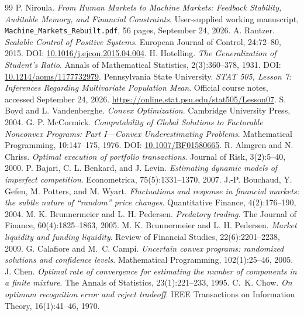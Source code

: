 \documentclass[11pt,a4paper]{article}
\theoremstyle{definition}\newtheorem{definition}[theorem]{Definition}
\theoremstyle{remark}\newtheorem{remark}[theorem]{Remark}
\begin{document}
\begin{thebibliography}{99}
 P. Niroula. \emph{From Human Markets to Machine Markets: Feedback Stability, Auditable Memory, and Financial Constraints}. User-supplied working manuscript, \texttt{Machine\_Markets\_Rebuilt.pdf}, 56 pages, September 24, 2026.
 A. Rantzer. \emph{Scalable Control of Positive Systems}. European Journal of Control, 24:72--80, 2015. DOI: \href{https://doi.org/10.1016/j.ejcon.2015.04.004}{10.1016/j.ejcon.2015.04.004}.
 H. Hotelling. \emph{The Generalization of Student's Ratio}. Annals of Mathematical Statistics, 2(3):360--378, 1931. DOI: \href{https://doi.org/10.1214/aoms/1177732979}{10.1214/aoms/1177732979}.
 Pennsylvania State University. \emph{STAT 505, Lesson 7: Inferences Regarding Multivariate Population Mean}. Official course notes, accessed September 24, 2026. \url{https://online.stat.psu.edu/stat505/Lesson07}.
 S. Boyd and L. Vandenberghe. \emph{Convex Optimization}. Cambridge University Press, 2004.
 G. P. McCormick. \emph{Computability of Global Solutions to Factorable Nonconvex Programs: Part I---Convex Underestimating Problems}. Mathematical Programming, 10:147--175, 1976. DOI: \href{https://doi.org/10.1007/BF01580665}{10.1007/BF01580665}.
 R. Almgren and N. Chriss. \emph{Optimal execution of portfolio transactions}. Journal of Risk, 3(2):5--40, 2000.
 P. Bajari, C. L. Benkard, and J. Levin. \emph{Estimating dynamic models of imperfect competition}. Econometrica, 75(5):1331--1370, 2007.
 J.-P. Bouchaud, Y. Gefen, M. Potters, and M. Wyart. \emph{Fluctuations and response in financial markets: the subtle nature of ``random'' price changes}. Quantitative Finance, 4(2):176--190, 2004.
 M. K. Brunnermeier and L. H. Pedersen. \emph{Predatory trading}. The Journal of Finance, 60(4):1825--1863, 2005.
 M. K. Brunnermeier and L. H. Pedersen. \emph{Market liquidity and funding liquidity}. Review of Financial Studies, 22(6):2201--2238, 2009.
 G. Calafiore and M.~C. Campi. \emph{Uncertain convex programs: randomized solutions and confidence levels}. Mathematical Programming, 102(1):25--46, 2005.
 J. Chen. \emph{Optimal rate of convergence for estimating the number of components in a finite mixture}. The Annals of Statistics, 23(1):221--233, 1995.
 C.~K. Chow. \emph{On optimum recognition error and reject tradeoff}. IEEE Transactions on Information Theory, 16(1):41--46, 1970.

\end{thebibliography}
\end{document}
